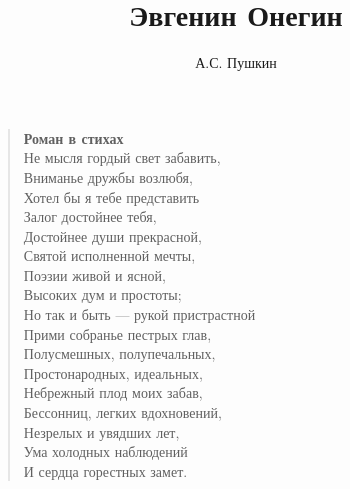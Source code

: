 \documentclass{book}
\title{Эвгенин Онегин}
\author{А.С. Пушкин}
\date{}
\newcommand{\ftn}{\footnote}%
\begin{document}
\maketitle
\begin{verse}
\textbf{Роман в стихах}\\
Не мысля гордый свет забавить,\\
Вниманье дружбы возлюбя,\\
Хотел бы я тебе представить\\
Залог достойнее тебя,\\
Достойнее души прекрасной,\\
Святой исполненной мечты,\\
Поэзии живой и ясной,\\
Высоких дум и простоты;\\
Но так и быть — рукой пристрастной\\
Прими собранье пестрых глав,\\
Полусмешных, полупечальных,\\
Простонародных, идеальных,\\
Небрежный плод моих забав,\\
Бессонниц, легких вдохновений,\\
Незрелых и увядших лет,\\
Ума холодных наблюдений\\
И сердца горестных замет.









%
%
%
%
%
%

%

\end{verse}
\end{document}
